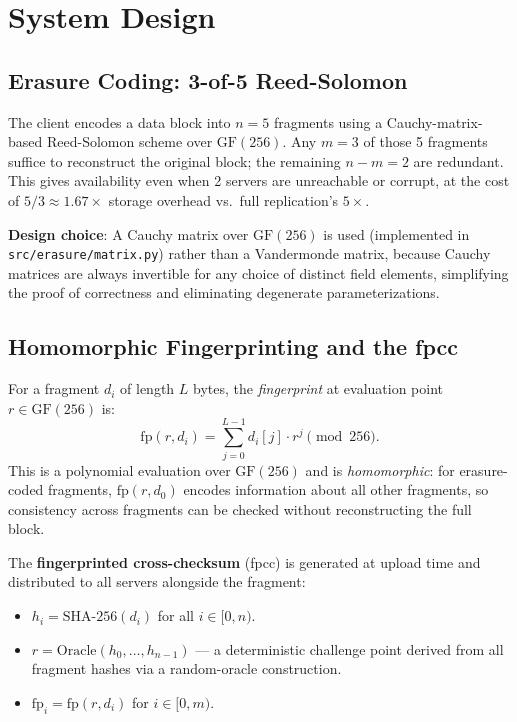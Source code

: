 \documentclass[10pt]{article}
\begin{document}
\section{System Design}

\subsection{Erasure Coding: 3-of-5 Reed-Solomon}

The client encodes a data block into $n = 5$ fragments using a Cauchy-matrix-based
Reed-Solomon scheme over $\mathrm{GF}(256)$. Any $m = 3$ of those 5 fragments suffice to
reconstruct the original block; the remaining $n - m = 2$ are redundant. This gives
availability even when 2 servers are unreachable or corrupt, at the cost of $5/3 \approx
1.67\times$ storage overhead vs.\ full replication's $5\times$.

\textbf{Design choice}: A Cauchy matrix over $\mathrm{GF}(256)$ is used (implemented in
\texttt{src/erasure/matrix.py}) rather than a Vandermonde matrix, because Cauchy matrices
are always invertible for any choice of distinct field elements, simplifying the proof of
correctness and eliminating degenerate parameterizations.

\subsection{Homomorphic Fingerprinting and the fpcc}

For a fragment $d_i$ of length $L$ bytes, the \emph{fingerprint} at evaluation point
$r \in \mathrm{GF}(256)$ is:
\[
  \mathrm{fp}(r, d_i) = \sum_{j=0}^{L-1} d_i[j] \cdot r^j \pmod{256}.
\]
This is a polynomial evaluation over $\mathrm{GF}(256)$ and is \emph{homomorphic}: for
erasure-coded fragments, $\mathrm{fp}(r, d_0)$ encodes information about all other
fragments, so consistency across fragments can be checked without reconstructing the full
block.

The \textbf{fingerprinted cross-checksum} (fpcc) is generated at upload time and distributed
to all servers alongside the fragment:
\begin{itemize}
  \item $h_i = \mathrm{SHA\text{-}256}(d_i)$ for all $i \in [0, n)$.
  \item $r = \mathrm{Oracle}(h_0, \ldots, h_{n-1})$ — a deterministic challenge point
        derived from all fragment hashes via a random-oracle construction.
  \item $\mathrm{fp}_i = \mathrm{fp}(r, d_i)$ for $i \in [0, m)$.
\end{itemize}
\end{document}
